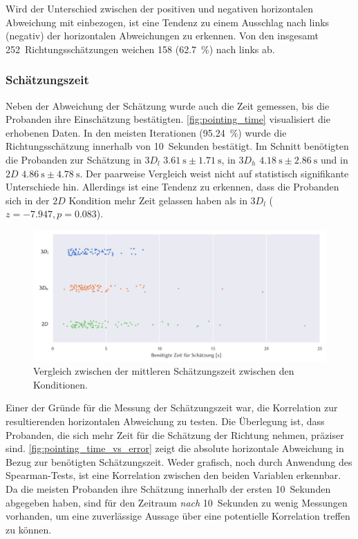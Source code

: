 Wird der Unterschied zwischen der positiven und negativen horizontalen Abweichung mit einbezogen, ist eine Tendenz zu einem Ausschlag nach links (negativ) der horizontalen Abweichungen zu erkennen.
Von den insgesamt 252~Richtungsschätzungen weichen 158 (\SI{62,7}{\percent}) nach links ab.

\subsubsection*{Schätzungszeit}
Neben der Abweichung der Schätzung wurde auch die Zeit gemessen, bis die Probanden ihre Einschätzung bestätigten.
\autoref{fig:pointing_time} visualisiert die erhobenen Daten.
In den meisten Iterationen (\SI{95,24}{\percent}) wurde die Richtungsschätzung innerhalb von 10~Sekunden bestätigt.
Im Schnitt benötigten die Probanden zur Schätzung in $3D_l$ $\SI{3,61}{\second} \pm \SI{1,71}{\second}$, in $3D_h$ \mbox{$\SI{4,18}{\second} \pm \SI{2,86}{\second}$} und in $2D$ $\SI{4,86}{\second} \pm \SI{4,78}{\second}$.
Der paarweise Vergleich weist nicht auf statistisch signifikante Unterschiede hin.
Allerdings ist eine Tendenz zu erkennen, dass die Probanden sich in der $2D$ Kondition mehr Zeit gelassen haben als in $3D_l$ ($z = -7.947,	p = 0.083$).
\begin{figure}[h]
    \centering
    \includegraphics[trim={0cm, 0cm, 0cm, 0.5cm}, clip, width=\linewidth]{figures/analysis/pointing_time}
    \caption{Vergleich zwischen der mittleren Schätzungszeit zwischen den Konditionen.}
    \label{fig:pointing_time}
\end{figure}

Einer der Gründe für die Messung der Schätzungszeit war, die Korrelation zur resultierenden horizontalen Abweichung zu testen.
Die Überlegung ist, dass Probanden, die sich mehr Zeit für die Schätzung der Richtung nehmen, präziser sind.
\autoref{fig:pointing_time_vs_error} zeigt die absolute horizontale Abweichung in Bezug zur benötigten Schätzungszeit.
Weder grafisch, noch durch Anwendung des Spearman-Tests, ist eine Korrelation zwischen den beiden Variablen erkennbar.
Da die meisten Probanden ihre Schätzung innerhalb der ersten 10~Sekunden abgegeben haben, sind für den Zeitraum \emph{nach} 10~Sekunden zu wenig Messungen vorhanden, um eine zuverlässige Aussage über eine potentielle Korrelation treffen zu können.

